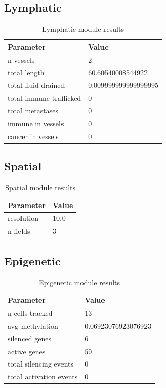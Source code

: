 \documentclass[12pt]{article}
\begin{document}
\subsection{Lymphatic}

\begin{table}[h]
\centering
\begin{tabular}{ll}
\toprule
Parameter & Value \\
\midrule
n vessels & 2 \\
total length & 60.60540008544922 \\
total fluid drained & 0.009999999999999995 \\
total immune trafficked & 0 \\
total metastases & 0 \\
immune in vessels & 0 \\
cancer in vessels & 0 \\
\bottomrule
\end{tabular}
\caption{Lymphatic module results}
\end{table}

\subsection{Spatial}

\begin{table}[h]
\centering
\begin{tabular}{ll}
\toprule
Parameter & Value \\
\midrule
resolution & 10.0 \\
n fields & 3 \\
\bottomrule
\end{tabular}
\caption{Spatial module results}
\end{table}

\subsection{Epigenetic}

\begin{table}[h]
\centering
\begin{tabular}{ll}
\toprule
Parameter & Value \\
\midrule
n cells tracked & 13 \\
avg methylation & 0.06923076923076923 \\
silenced genes & 6 \\
active genes & 59 \\
total silencing events & 0 \\
total activation events & 0 \\
\bottomrule
\end{tabular}
\caption{Epigenetic module results}
\end{table}
\end{document}
